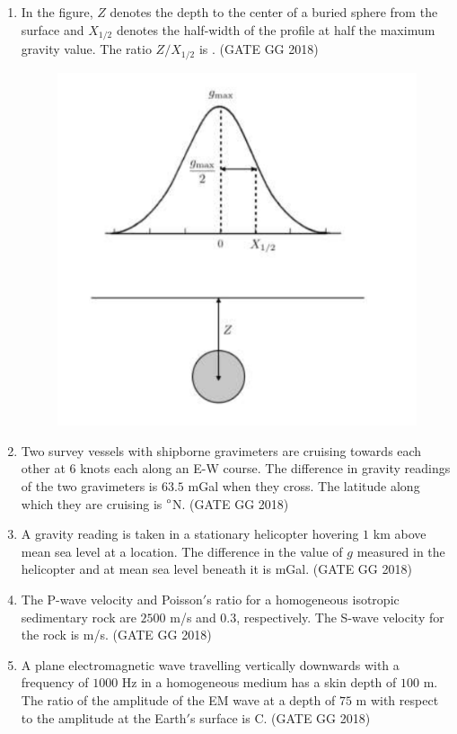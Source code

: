 \documentclass[journal]{IEEEtran}
\begin{document}
\begin{enumerate}[start=1]
\item In the figure, $Z$ denotes the depth to the center of a buried sphere from the surface and $X_{1/2}$ denotes the half-width of the profile at half the maximum gravity value. The ratio $Z/X_{1/2}$ \makebox[2cm]{\hrulefill} is .
\hfill(GATE GG 2018)
\begin{figure}[H]
        \centering
        \includegraphics[width=0.5\columnwidth]{figs/11.png}
        \caption*{}
        \label{fig:q10}
    \end{figure}

\item Two survey vessels with shipborne gravimeters are cruising towards each other at $6$ knots each along an E-W course. The difference in gravity readings of the two gravimeters is $63.5$ mGal when they cross. The latitude along which they are cruising is \makebox[2cm]{\hrulefill}$\degree$N.
\hfill(GATE GG 2018)
\vspace{0.5cm}

\item A gravity reading is taken in a stationary helicopter hovering $1$ km above mean sea level at a location. The difference in the value of $g$ measured in the helicopter and at mean sea level beneath it is  \makebox[2cm]{\hrulefill} mGal.
\hfill(GATE GG 2018)
\vspace{0.5cm}

\item The P-wave velocity and Poisson$'$s ratio for a homogeneous isotropic sedimentary rock are $2500$ m/s and $0.3$, respectively. The S-wave velocity for the rock is \makebox[2cm]{\hrulefill} m/s.
\hfill(GATE GG 2018)
\vspace{0.5cm}

\item A plane electromagnetic  wave travelling vertically downwards with a frequency of $1000$ Hz in a homogeneous medium has a skin depth of $100$ m. The ratio of the amplitude of the EM wave at a depth of $75$ m with respect to the amplitude at the Earth$'$s surface is C.
\hfill(GATE GG 2018)
\vspace{1cm}


\end{enumerate}
\end{document}
